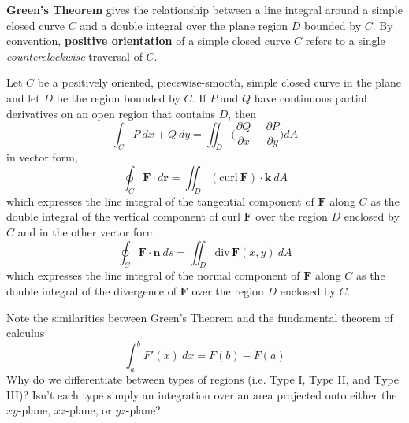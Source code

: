 \documentclass[../main.tex]{subfiles}
\begin{document}
\textbf{Green's Theorem} gives the relationship between a line integral around a simple closed curve $C$ and a double integral over the plane region $D$ bounded by $C$. By convention, \textbf{positive orientation} of a simple closed curve $C$ refers to a single \textit{counterclockwise} traversal of $C$.

\begin{theorem}
Let $C$ be a positively oriented, piecewise-smooth, simple closed curve in the plane and let $D$ be the region bounded by $C$. If $P$ and $Q$ have continuous partial derivatives on an open region that contains $D$, then
\begin{equation*}
	\int_C{P\ dx + Q\ dy} = \iint_D{\Big(\frac{\partial Q}{\partial x} - \frac{\partial P}{\partial y }\Big)dA}
\end{equation*}
in vector form,
\begin{equation}
	\oint_C{\textbf{F}\cdot d\textbf{r}} = \iint_D{(\text{curl}\ \textbf{F})\cdot \textbf{k}\ dA}
\end{equation}
which expresses the line integral of the tangential component of $\textbf{F}$ along $C$ as the double integral of the vertical component of curl $\textbf{F}$ over the region $D$ enclosed by $C$ and in the other vector form
\begin{equation}
	\oint_C{\textbf{F}\cdot \textbf{n}\ ds} = \iint_D{\text{div}\,\textbf{F}(x,y)\ dA}
\end{equation}
which expresses the line integral of the normal component of $\textbf{F}$ along $C$ as the double integral of the divergence of $\textbf{F}$ over the region $D$ enclosed by $C$.

\end{theorem}
Note the similarities between Green's Theorem and the fundamental theorem of calculus
\begin{equation*}
\int_a^b{F'(x)\ dx} = F(b) - F(a)
\end{equation*}
\color{red}Why do we differentiate between types of regions (i.e. Type I, Type II, and Type III)? Isn't each type simply an integration over an area projected onto either the $xy$-plane, $xz$-plane, or $yz$-plane?\color{black}
\end{document}
